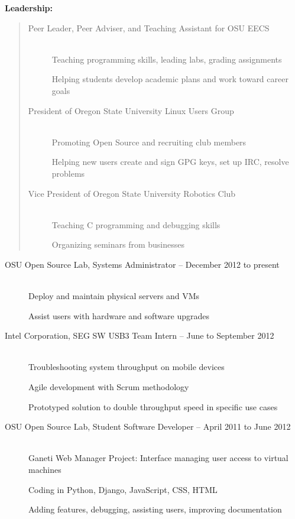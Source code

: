 \documentclass[11pt]{article}
\begin{document}
{\large \bf Leadership:}
\begin{quote}
\begin{description}
    \item[Peer Leader, Peer Adviser, and Teaching Assistant for OSU EECS]
        \hfill \\ 
        Teaching programming skills, leading labs, grading assignments
        
        Helping students develop academic plans and work toward career goals

    \item[President of Oregon State University Linux Users Group]
        \hfill \\
        Promoting Open Source and recruiting club members

        Helping new users create and sign GPG keys, set up IRC, resolve problems

    \item[Vice President of Oregon State University Robotics Club]
        \hfill \\
        Teaching C programming and debugging skills

        Organizing seminars from businesses

\end{description}
\end{quote}

\hrulefill
\smallskip

\begin{description}
\item[OSU Open Source Lab, Systems Administrator -- December 2012 to present]
    \hfill \\
    Deploy and maintain physical servers and VMs

    Assist users with hardware and software upgrades

\item[Intel Corporation, SEG SW USB3 Team Intern -- June to September
2012]
    \hfill \\
    Troubleshooting system throughput on mobile devices

    Agile development with Scrum methodology

    Prototyped solution to double throughput speed in specific use cases

\item[OSU Open Source Lab, Student Software Developer -- April 2011 to June
2012]
    \hfill \\
    Ganeti Web Manager Project: Interface managing user access to
    virtual machines

    Coding in Python, Django, JavaScript, CSS, HTML

    Adding features, debugging, assisting users, improving documentation

\end{description}
\end{document}
